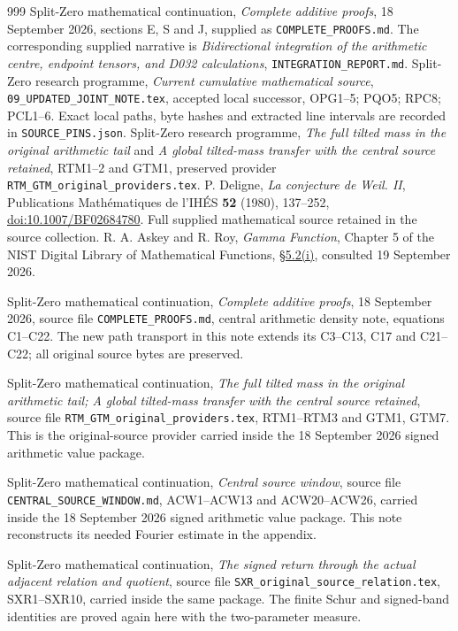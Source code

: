 \begin{thebibliography}{999}
Split-Zero mathematical continuation,
\emph{Complete additive proofs}, 18 September 2026,
sections E, S and J, supplied as \texttt{COMPLETE\_PROOFS.md}.
The corresponding supplied narrative is
\emph{Bidirectional integration of the arithmetic centre, endpoint tensors,
and D032 calculations}, \texttt{INTEGRATION\_REPORT.md}.
Split-Zero research programme,
\emph{Current cumulative mathematical source},
\texttt{09\_UPDATED\_JOINT\_NOTE.tex}, accepted local successor,
OPG1--5; PQO5; RPC8; PCL1--6.
Exact local paths, byte hashes and extracted line intervals are
recorded in \texttt{SOURCE\_PINS.json}.
Split-Zero research programme,
\emph{The full tilted mass in the original arithmetic tail}
and \emph{A global tilted-mass transfer with the central source retained},
RTM1--2 and GTM1, preserved provider
\texttt{RTM\_GTM\_original\_providers.tex}.
P. Deligne, \emph{La conjecture de Weil. II},
Publications Math\'ematiques de l'IH\'ES \textbf{52} (1980), 137--252,
\href{https://doi.org/10.1007/BF02684780}{doi:10.1007/BF02684780}.
Full supplied mathematical source retained in the source collection.
R. A. Askey and R. Roy, \emph{Gamma Function}, Chapter 5 of the
NIST Digital Library of Mathematical Functions,
\href{https://dlmf.nist.gov/5.2}{\S5.2(i)}, consulted 19 September 2026.

Split-Zero mathematical continuation,
\emph{Complete additive proofs}, 18 September 2026,
source file \texttt{COMPLETE\_PROOFS.md},
central arithmetic density note, equations C1--C22.
The new path transport in this note extends its C3--C13,
C17 and C21--C22; all original source bytes are preserved.

Split-Zero mathematical continuation,
\emph{The full tilted mass in the original arithmetic tail;
A global tilted-mass transfer with the central source retained},
source file \texttt{RTM\_GTM\_original\_providers.tex},
RTM1--RTM3 and GTM1, GTM7.
This is the original-source provider carried inside the
18 September 2026 signed arithmetic value package.

Split-Zero mathematical continuation,
\emph{Central source window},
source file \texttt{CENTRAL\_SOURCE\_WINDOW.md},
ACW1--ACW13 and ACW20--ACW26,
carried inside the 18 September 2026 signed arithmetic
value package.  This note reconstructs its needed Fourier
estimate in the appendix.

Split-Zero mathematical continuation,
\emph{The signed return through the actual adjacent relation and quotient},
source file \texttt{SXR\_original\_source\_relation.tex},
SXR1--SXR10, carried inside the same package.
The finite Schur and signed-band identities are proved
again here with the two-parameter measure.


\end{thebibliography}
